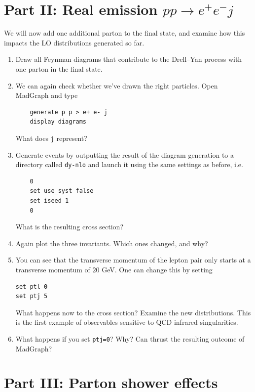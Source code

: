 \documentclass{article}
\begin{document}
\section*{Part II: Real emission $pp \to e^+ e^- j$}
We will now add one additional parton to the final state, and examine how this impacts the LO distributions generated so far. 
\begin{enumerate}
\item Draw all Feynman diagrams that contribute to the Drell--Yan  process with one parton in the final state. 
\item We can again check whether we've drawn the right particles. Open MadGraph and type
\begin{verbatim}
	generate p p > e+ e- j
	display diagrams
\end{verbatim}
What does \texttt{j} represent? 
\item Generate events by outputting the result of the diagram generation to a directory called \texttt{dy-nlo} and launch it using the same settings as before, i.e.\
\begin{verbatim}
	0
	set use_syst false
	set iseed 1
	0
\end{verbatim}
What is the resulting cross section? 
\item Again plot the three invariants. Which ones changed, and why? 
\item You can see that the transverse momentum of the lepton pair only starts at a transverse momentum of $20$ GeV. One can change this by setting
\begin{verbatim}
set ptl 0
set ptj 5
\end{verbatim}
What happens now to the cross section? Examine the new distributions. This is the first example of observables sensitive to QCD infrared singularities. 
\item What happens if you set \texttt{ptj=0}? Why? Can thrust the resulting outcome of MadGraph?
\end{enumerate}

\newpage
\section*{Part III: Parton shower effects}
\end{document}

